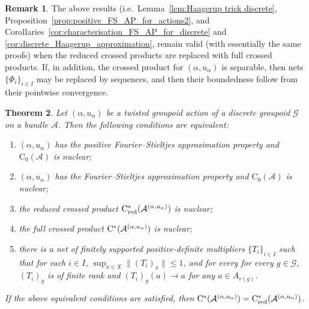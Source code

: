 \documentclass[11 pt, leqno]{amsart}
\numberwithin{equation}{section}
\theoremstyle{plain}
\newtheorem{thm}{Theorem}[section]
\theoremstyle{definition}
\newtheorem {rem} [thm]{Remark}
\newcommand*{\contz}{\mathrm{C_0}}%
\DeclareMathOperator{\red}{red}%
\newcommand{\G}{\mathcal G} %
\newcommand{\A}{\mathcal A}
\newcommand{\cst}{\ifmmode\mathrm{C}^*\else{$\mathrm{C}^*$}\fi}
\begin{document}
\begin{rem}\label{rem:about_full_case}
The above results (i.e.\ Lemma~\ref{lem:Haagerup trick discrete}, Proposition~\ref{prop:positive_FS_AP_for_actions2}, and Corollaries~\ref{cor:characterisation_FS_AP_for_discrete} and \ref{cor:discrete_Haagerup_approximation}, remain valid (with essentially the same proofs) when the reduced crossed products are replaced with full crossed products. 
If, in addition, the crossed product for $(\alpha,u_{\alpha})$ is separable, then nets $\{\Phi_{i}\}_{i\in I}$ may be replaced by sequences, and then their boundedness follow from their pointwise convergence.  
\end{rem}

\begin{thm}\label{thm:characterisation of nuclearity}
Let $(\alpha,u_{\alpha})$ be a twisted groupoid action of a discrete groupoid $\G$ on a bundle $\A$.
Then the following conditions are equivalent:
\begin{enumerate}
    \item\label{enu:characterisation of nuclearity1} $(\alpha,u_{\alpha})$ has the positive Fourier--Stieltjes approximation property and $\contz(\A)$ is nuclear;
    \item\label{enu:characterisation of nuclearity1.5} $(\alpha,u_{\alpha})$ has the Fourier--Stieltjes approximation property and $\contz(\A)$ is nuclear;
    \item\label{enu:characterisation of nuclearity2} the reduced crossed product $\cst_{\red}(\A^{(\alpha,u_\alpha)})$ is nuclear;
    \item\label{enu:characterisation of nuclearity3} the full crossed product $\cst(\A^{(\alpha,u_\alpha)})$ is nuclear;
    \item\label{enu:characterisation of nuclearity4} there is a net of finitely supported positive-definite multipliers $\{T_i\}_{i\in I}$ such that for each $i\in I$, $\sup_{x\in X}\|(T_i)_x\|\leq 1$, and for every for every $g \in \G$, $(T_{i})_g$ is of finite rank and $(T_i)_g(a)\to a$ for any $a\in A_{r(g)}$.
\end{enumerate}
If the above equivalent conditions are satisfied, then $\cst(\A^{(\alpha,u_\alpha)}) = \cst_{\red}(\A^{(\alpha,u_\alpha)})$. 
\end{thm}
\end{document}
